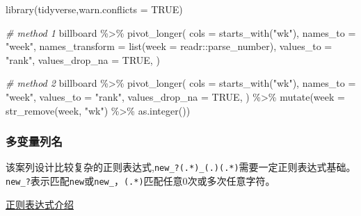 \documentclass[
]{book}
\newenvironment{Shaded}{\begin{snugshade}}{\end{snugshade}}
\newcommand{\AttributeTok}[1]{\textcolor[rgb]{0.77,0.63,0.00}{#1}}
\newcommand{\CommentTok}[1]{\textcolor[rgb]{0.56,0.35,0.01}{\textit{#1}}}
\newcommand{\ConstantTok}[1]{\textcolor[rgb]{0.00,0.00,0.00}{#1}}
\newcommand{\FunctionTok}[1]{\textcolor[rgb]{0.00,0.00,0.00}{#1}}
\newcommand{\NormalTok}[1]{#1}
\newcommand{\SpecialCharTok}[1]{\textcolor[rgb]{0.00,0.00,0.00}{#1}}
\newcommand{\StringTok}[1]{\textcolor[rgb]{0.31,0.60,0.02}{#1}}
\begin{document}
\begin{Shaded}
\begin{Highlighting}[]
\FunctionTok{library}\NormalTok{(tidyverse,}\AttributeTok{warn.conflicts =} \ConstantTok{TRUE}\NormalTok{)}

\CommentTok{\# method 1}
\NormalTok{billboard }\SpecialCharTok{\%\textgreater{}\%} 
  \FunctionTok{pivot\_longer}\NormalTok{(}
    \AttributeTok{cols =} \FunctionTok{starts\_with}\NormalTok{(}\StringTok{"wk"}\NormalTok{), }
    \AttributeTok{names\_to =} \StringTok{"week"}\NormalTok{, }
    \AttributeTok{names\_transform =} \FunctionTok{list}\NormalTok{(}\AttributeTok{week =}\NormalTok{ readr}\SpecialCharTok{::}\NormalTok{parse\_number),}
    \AttributeTok{values\_to =} \StringTok{"rank"}\NormalTok{,}
    \AttributeTok{values\_drop\_na =} \ConstantTok{TRUE}\NormalTok{,}
\NormalTok{)}

\CommentTok{\# method 2}
\NormalTok{billboard }\SpecialCharTok{\%\textgreater{}\%}
  \FunctionTok{pivot\_longer}\NormalTok{(}
    \AttributeTok{cols =} \FunctionTok{starts\_with}\NormalTok{(}\StringTok{"wk"}\NormalTok{),}
    \AttributeTok{names\_to =} \StringTok{"week"}\NormalTok{,}
    \AttributeTok{values\_to =} \StringTok{"rank"}\NormalTok{,}
    \AttributeTok{values\_drop\_na =} \ConstantTok{TRUE}\NormalTok{,}
\NormalTok{  ) }\SpecialCharTok{\%\textgreater{}\%}
  \FunctionTok{mutate}\NormalTok{(}\AttributeTok{week =} \FunctionTok{str\_remove}\NormalTok{(week, }\StringTok{"wk"}\NormalTok{) }\SpecialCharTok{\%\textgreater{}\%} \FunctionTok{as.integer}\NormalTok{())}
\end{Highlighting}
\end{Shaded}

\hypertarget{ux591aux53d8ux91cfux5217ux540d}{%
\subsubsection{多变量列名}\label{ux591aux53d8ux91cfux5217ux540d}}

该案列设计比较复杂的正则表达式,\texttt{new\_?(.*)\_(.)(.*)}需要一定正则表达式基础。
\texttt{new\_?}表示匹配\texttt{new}或\texttt{new\_}，\texttt{(.*)}匹配任意0次或多次任意字符。

\href{https://www.runoob.com/regexp/regexp-syntax.html}{正则表达式介绍}
\end{document}

